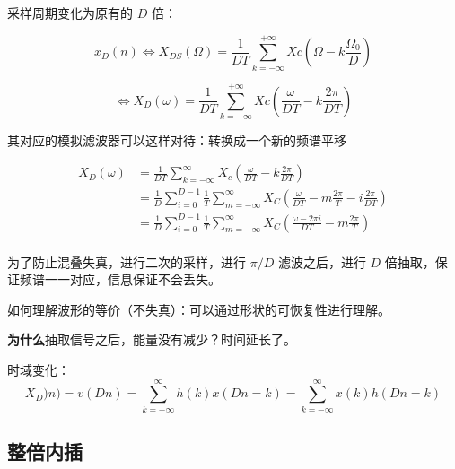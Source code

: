 \documentclass[cn,11pt,chinese,black,simple]{../elegantbook}
\begin{document}
采样周期变化为原有的 \(D\) 倍：

\[x_{D}(n) \Leftrightarrow X_{D S}(\Omega)=\frac{1}{D T} \sum_{k=-\infty}^{+\infty} X c\left(\Omega-k \frac{\Omega_{0}}{D}\right) \] 

\[\Leftrightarrow X_{D}(\omega)=\frac{1}{D T} \sum_{k=-\infty}^{+\infty} X c\left(\frac{\omega}{D T}-k \frac{2 \pi}{D T}\right)\] 

其对应的模拟滤波器可以这样对待：转换成一个新的频谱平移 

\[\begin{aligned}
    X_D(\omega) &= \frac{1}{DT} \sum_{k = -\infty}^\infty X_c(\frac{\omega}{DT} - k \frac{2\pi}{DT}) \\ 
    &= \frac{1}{D} \sum_{i = 0}^{D-1} \frac{1}{T} \sum_{m=-\infty}^\infty X_C (\frac{\omega}{DT} - m \frac{2\pi}{T} - i \frac{2 \pi}{DT}) \\ 
    &= \frac{1}{D} \sum_{i = 0}^{D-1} \frac{1}{T} \sum_{m=-\infty}^\infty X_C (\frac{\omega - 2 \pi i}{DT} - m \frac{2\pi}{T}) \\ 
\end{aligned}\]

为了防止混叠失真，进行二次的采样，进行 \(\pi/D\) 滤波之后，进行 \(D\) 倍抽取，保证频谱一一对应，信息保证不会丢失。

如何理解波形的等价（不失真）：可以通过形状的可恢复性进行理解。

\textbf{为什么}抽取信号之后，能量没有减少？时间延长了。

时域变化：  \[X_D)n) = v (D n) = \sum_{k=-\infty}^\infty h(k) x(Dn = k) = \sum_{k=-\infty}^\infty x(k) h(Dn = k)\]

\subsection{整倍内插}



\let\chapname\undefined
\ifx\mainclass\undefined
\end{document}
